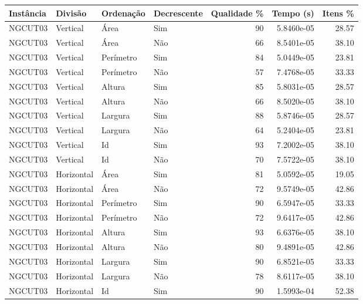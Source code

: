 \begin{tabular}{llllrrr}
\hline
Instância & Divisão     & Ordenação & Decrescente & Qualidade \% & Tempo (s)  & Itens \% \\
\hline
NGCUT03   & Vertical    & Área      & Sim         & 90           & 5.8460e-05 & 28.57    \\
NGCUT03   & Vertical    & Área      & Não         & 66           & 8.5401e-05 & 38.10    \\
NGCUT03   & Vertical    & Perímetro & Sim         & 84           & 5.0449e-05 & 23.81    \\
NGCUT03   & Vertical    & Perímetro & Não         & 57           & 7.4768e-05 & 33.33    \\
NGCUT03   & Vertical    & Altura    & Sim         & 85           & 5.8031e-05 & 28.57    \\
NGCUT03   & Vertical    & Altura    & Não         & 66           & 8.5020e-05 & 38.10    \\
NGCUT03   & Vertical    & Largura   & Sim         & 88           & 5.8746e-05 & 28.57    \\
NGCUT03   & Vertical    & Largura   & Não         & 64           & 5.2404e-05 & 23.81    \\
NGCUT03   & Vertical    & Id        & Sim         & 93           & 7.2002e-05 & 38.10    \\
NGCUT03   & Vertical    & Id        & Não         & 70           & 7.5722e-05 & 38.10    \\
NGCUT03   & Horizontal  & Área      & Sim         & 81           & 5.0592e-05 & 19.05    \\
NGCUT03   & Horizontal  & Área      & Não         & 72           & 9.5749e-05 & 42.86    \\
NGCUT03   & Horizontal  & Perímetro & Sim         & 90           & 6.5947e-05 & 33.33    \\
NGCUT03   & Horizontal  & Perímetro & Não         & 72           & 9.6417e-05 & 42.86    \\
NGCUT03   & Horizontal  & Altura    & Sim         & 93           & 6.6376e-05 & 38.10    \\
NGCUT03   & Horizontal  & Altura    & Não         & 80           & 9.4891e-05 & 42.86    \\
NGCUT03   & Horizontal  & Largura   & Sim         & 90           & 6.8521e-05 & 33.33    \\
NGCUT03   & Horizontal  & Largura   & Não         & 78           & 8.6117e-05 & 38.10    \\
NGCUT03   & Horizontal  & Id        & Sim         & 90           & 1.5993e-04 & 52.38    \\

\end{tabular}
